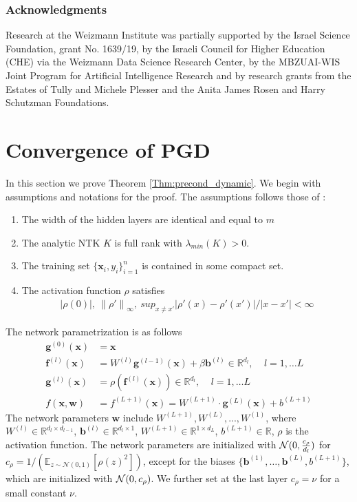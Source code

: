 \documentclass[10pt]{article} %
\theoremstyle{plain}
\theoremstyle{definition}
\theoremstyle{remark}
\newcommand{\Real}{\mathbb{R}}
\newcommand{\norm}[1]{\left\lVert#1\right\rVert}
\newcommand{\x}{\mathbf{x}}
\newcommand{\w}{\mathbf{w}}
\newcommand{\f}{\mathbf{f}}
\newcommand{\g}{\mathbf{g}}
\begin{document}
\subsubsection*{Acknowledgments}
Research at the Weizmann Institute was partially supported by the Israel Science Foundation, grant No. 1639/19, by the Israeli Council for Higher Education (CHE) via the Weizmann Data Science Research Center, by the MBZUAI-WIS Joint Program for Artificial Intelligence Research and by research grants from the Estates of Tully and Michele Plesser and the Anita James Rosen and Harry Schutzman Foundations.




\newpage
\appendix
\section{Convergence of PGD}\label{appendix:convergence}
In this section we prove Theorem \ref{Thm:precond_dynamic}. We begin with assumptions and notations for the proof. The assumptions follows those of \citet{lee2019wide}:
\begin{enumerate}
    \item \label{assumption:1} The width of the hidden layers are identical and equal to $m$
    \item The analytic NTK $K$ is full rank with $\lambda_{min}(K)>0$. %
    \item \label{assumption:3} The training set $\{\x_i,y_i\}_{i=1}^n$ is contained in some compact set.
    \item \label{assumption:4} The activation function $\rho$ satisfies
    \begin{align*}
        |\rho(0)|,~\norm{\rho'}_\infty, ~sup_{x\neq x'}|\rho'(x)-\rho'(x')|/|x-x'|<\infty  
    \end{align*}
\end{enumerate}
The network parametrization is as follows
\begin{align*}
    \g^{(0)}(\x) & = \x  \\
    \f^{(l)}(\x) & = W^{(l)}\g^{(l-1)} (\x) + \beta \mathbf{b}^{(l)}  \in \Real^{d_l}, ~~~~~l=1,\ldots L \\
    \g^{(l)}(\x) & = 
    \rho\left(\f^{(l)}(\x)\right)\in \Real^{d_l}, ~~~~~l=1,\ldots L \\
    f(\x,\w) & = f^{(L+1)}(\x) = W^{(L+1)} \cdot \g^{(L)}(\x) + b^{(L+1)}
\end{align*}
The network parameters $\w$ include $W^{(L+1)},W^{(L)},...,W^{(1)}$, where $W^{(l)} \in \Real^{d_l \times d_{l-1}}$, $\mathbf{b}^{(l)}\in \Real^{d_l\times 1}$, $W^{(L+1)} \in \Real^{1 \times d_L}$, $b^{(L+1)}\in \Real$, $\rho$ is the activation function. The  network parameters are initialized with ${\cal N}(0,\frac{c_\rho}{d_l})$ for $c_{\rho} = 1/\left( \mathbb{E}_{z \sim \mathcal{N}(0,1)} [\rho(z)^2] \right) $, except for the biases $\{\mathbf{b}^{(1)}, \ldots,\mathbf{b}^{(L)},b^{(L+1)}\}$, which are initialized with ${\cal N}(0,c_\rho)$. We further set at the last layer $c_\rho=\nu$ for a small constant $\nu$.
\end{document}
